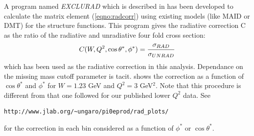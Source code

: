 A program named {\it EXCLURAD} which is described in \cite{bib:radcorr} has been developed to calculate the matrix element (\ref{eqno:radcorr}) using
existing models (like MAID or DMT) for the structure functions. This program gives the radiative correction C as the ratio of the radiative
and unradiative four fold cross section:
$$
C(W, Q^2, \cos\theta^*, \phi^*) =\frac{\displaystyle \sigma_{RAD}}{\displaystyle \sigma_{UNRAD}}
$$
which has been used as the radiative correction in this analysis.
Dependance on the missing mass cutoff parameter is tacit.
 shows the correction as a function 
of $\cos\theta^*$ and $\phi^*$ for $W=1.23$ GeV and $Q^2=3$ GeV$^2$.
Note that this procedure is different from that one followed for our published lower $Q^2$ data.
See    \begin{verbatim} 
http://www.jlab.org/~ungaro/pi0eprod/rad_plots/
\end{verbatim}
for the correction in each bin considered as a function of $\phi^*$ or $\cos\theta^*$.































